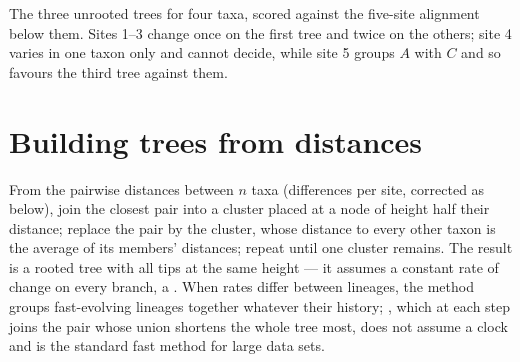 \begin{omfigure}

{\small The three unrooted trees for four taxa, scored against the
five-site alignment below them. Sites 1--3 change once on the first
tree and twice on the others; site 4 varies in one taxon only and
cannot decide, while site 5 groups $A$ with $C$ and so favours the
third tree against them.}
\end{omfigure}

\section{Building trees from distances}

\begin{method}\label{meth:b2:phylogenetic-trees:upgma}
From the pairwise distances between $n$ taxa (differences per site,
corrected as below), join the closest pair into a cluster placed at
a node of height half their distance; replace the pair by the
cluster, whose distance to every other taxon is the average of its
members' distances; repeat until one cluster remains. The result
is a rooted tree with all tips at the same height --- it assumes
a constant rate of change on every branch, a . When
rates differ between lineages, the method groups fast-evolving
lineages together whatever their history; \emph{},
which at each step joins the pair whose union shortens the whole
tree most, does not assume a clock and is the standard fast method
for large data sets.
\end{method}

